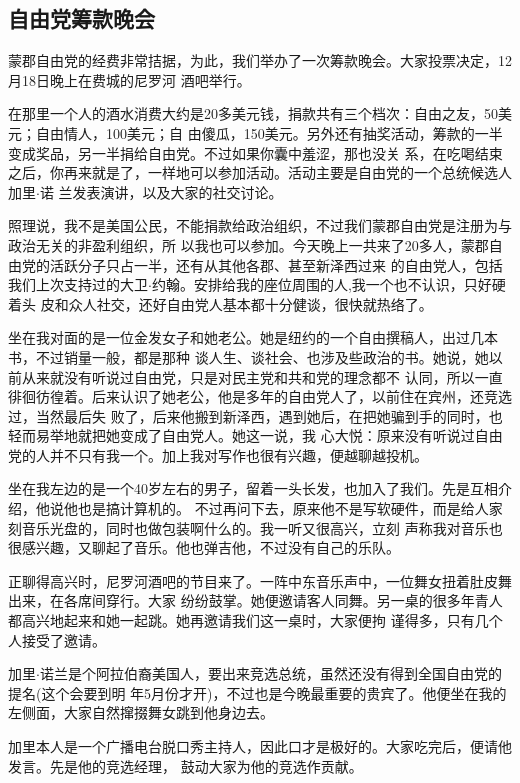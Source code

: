 ﻿\documentclass[11pt]{article}
\begin{document}
\subsection{自由党筹款晚会}

蒙郡自由党的经费非常拮据，为此，我们举办了一次筹款晚会。大家投票决定，12月18日晚上在费城的尼罗河
酒吧举行。

在那里一个人的酒水消费大约是20多美元钱，捐款共有三个档次：自由之友，50美元；自由情人，100美元；自
由傻瓜，150美元。另外还有抽奖活动，筹款的一半变成奖品，另一半捐给自由党。不过如果你囊中羞涩，那也没关
系，在吃喝结束之后，你再来就是了，一样地可以参加活动。活动主要是自由党的一个总统候选人加里$\cdot$诺
兰发表演讲，以及大家的社交讨论。

照理说，我不是美国公民，不能捐款给政治组织，不过我们蒙郡自由党是注册为与政治无关的非盈利组织，所
以我也可以参加。今天晚上一共来了20多人，蒙郡自由党的活跃分子只占一半，还有从其他各郡、甚至新泽西过来
的自由党人，包括我们上次支持过的大卫$\cdot$约翰。安排给我的座位周围的人,我一个也不认识，只好硬着头
皮和众人社交，还好自由党人基本都十分健谈，很快就热络了。

坐在我对面的是一位金发女子和她老公。她是纽约的一个自由撰稿人，出过几本书，不过销量一般，都是那种
谈人生、谈社会、也涉及些政治的书。她说，她以前从来就没有听说过自由党，只是对民主党和共和党的理念都不
认同，所以一直徘徊彷徨着。后来认识了她老公，他是多年的自由党人了，以前住在宾州，还竞选过，当然最后失
败了，后来他搬到新泽西，遇到她后，在把她骗到手的同时，也轻而易举地就把她变成了自由党人。她这一说，我
心大悦：原来没有听说过自由党的人并不只有我一个。加上我对写作也很有兴趣，便越聊越投机。

坐在我左边的是一个40岁左右的男子，留着一头长发，也加入了我们。先是互相介绍，他说他也是搞计算机的。
不过再问下去，原来他不是写软硬件，而是给人家刻音乐光盘的，同时也做包装啊什么的。我一听又很高兴，立刻
声称我对音乐也很感兴趣，又聊起了音乐。他也弹吉他，不过没有自己的乐队。

正聊得高兴时，尼罗河酒吧的节目来了。一阵中东音乐声中，一位舞女扭着肚皮舞出来，在各席间穿行。大家
纷纷鼓掌。她便邀请客人同舞。另一桌的很多年青人都高兴地起来和她一起跳。她再邀请我们这一桌时，大家便拘
谨得多，只有几个人接受了邀请。

加里$\cdot$诺兰是个阿拉伯裔美国人，要出来竞选总统，虽然还没有得到全国自由党的提名(这个会要到明
年5月份才开)，不过也是今晚最重要的贵宾了。他便坐在我的左侧面，大家自然撺掇舞女跳到他身边去。

加里本人是一个广播电台脱口秀主持人，因此口才是极好的。大家吃完后，便请他发言。先是他的竞选经理，
鼓动大家为他的竞选作贡献。
\end{document}
